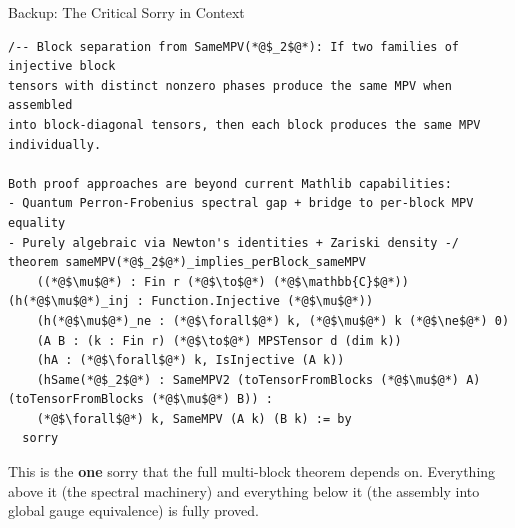 \documentclass[aspectratio=169,10pt]{beamer}
\begin{document}
\begin{frame}[fragile]{Backup: The Critical Sorry in Context}
\vspace{-0.7em}
\begin{lstlisting}[basicstyle=\ttfamily\fontsize{5}{6.5}\selectfont\color{white}]
/-- Block separation from SameMPV(*@$_2$@*): If two families of injective block
tensors with distinct nonzero phases produce the same MPV when assembled
into block-diagonal tensors, then each block produces the same MPV
individually.

Both proof approaches are beyond current Mathlib capabilities:
- Quantum Perron-Frobenius spectral gap + bridge to per-block MPV equality
- Purely algebraic via Newton's identities + Zariski density -/
theorem sameMPV(*@$_2$@*)_implies_perBlock_sameMPV
    ((*@$\mu$@*) : Fin r (*@$\to$@*) (*@$\mathbb{C}$@*)) (h(*@$\mu$@*)_inj : Function.Injective (*@$\mu$@*))
    (h(*@$\mu$@*)_ne : (*@$\forall$@*) k, (*@$\mu$@*) k (*@$\ne$@*) 0)
    (A B : (k : Fin r) (*@$\to$@*) MPSTensor d (dim k))
    (hA : (*@$\forall$@*) k, IsInjective (A k))
    (hSame(*@$_2$@*) : SameMPV2 (toTensorFromBlocks (*@$\mu$@*) A) (toTensorFromBlocks (*@$\mu$@*) B)) :
    (*@$\forall$@*) k, SameMPV (A k) (B k) := by
  sorry
\end{lstlisting}

\vspace{0.1em}
{\small This is the \textbf{one} sorry that the full multi-block theorem depends on.
Everything above it (the spectral machinery) and everything below it
(the assembly into global gauge equivalence) is fully proved.}
\end{frame}
\end{document}
